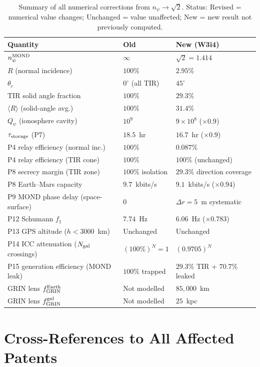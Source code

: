 \documentclass[aps,prd,twocolumn,superscriptaddress]{revtex4-2}
\newcommand{\Qpsi}{Q_\psi}
\newcommand{\npsi}{n_\psi}
\newcommand{\ee}[1]{\times 10^{#1}}
\begin{document}
\begin{table}[h]
\centering
\caption{Summary of all numerical corrections from $\npsi \to \sqrt{2}$.
Status: Revised = numerical value changes; Unchanged = value unaffected;
New = new result not previously computed.}
\label{tab:summary}
\begin{tabular}{lll}
\toprule
Quantity & Old & New (W3i4) \\
\midrule
$\npsi^{\rm MOND}$ & $\infty$ & $\sqrt{2} = 1.414$ \\
$R$ (normal incidence) & $100\%$ & $2.95\%$ \\
$\theta_c$ & $0^\circ$ (all TIR) & $45^\circ$ \\
TIR solid angle fraction & $100\%$ & $29.3\%$ \\
$\langle R \rangle$ (solid-angle avg.) & $100\%$ & $31.4\%$ \\
$\Qpsi$ (ionosphere cavity) & $10^9$ & $9\ee8$ ($\times 0.9$) \\
$\tau_{\rm storage}$ (P7) & $18.5$~hr & $16.7$~hr ($\times 0.9$) \\
P4 relay efficiency (normal inc.) & $100\%$ & $0.087\%$ \\
P4 relay efficiency (TIR cone) & $100\%$ & $100\%$ (unchanged) \\
P8 secrecy margin (TIR zone) & $100\%$ isolation & $29.3\%$ direction coverage \\
P8 Earth--Mars capacity & $9.7$~kbits/s & $9.1$~kbits/s ($\times 0.94$) \\
P9 MOND phase delay (space-surface) & $0$ & $\Delta r = 5$~m systematic \\
P12 Schumann $f_1$ & $7.74$~Hz & $6.06$~Hz ($\times 0.783$) \\
P13 GPS altitude ($h < 3000$~km) & Unchanged & Unchanged \\
P14 ICC attenuation ($N_{\rm gal}$ crossings) & $(100\%)^N = 1$ & $(0.9705)^N$ \\
P15 generation efficiency (MOND leak) & $100\%$ trapped & $29.3\%$ TIR + $70.7\%$ leaked \\
GRIN lens $f_{\rm GRIN}^{\rm Earth}$ & Not modelled & $85{,}000$~km \\
GRIN lens $f_{\rm GRIN}^{\rm gal}$ & Not modelled & $25$~kpc \\
\bottomrule
\end{tabular}
\end{table}

\section{Cross-References to All Affected Patents}
\label{sec:xref}
\end{document}
